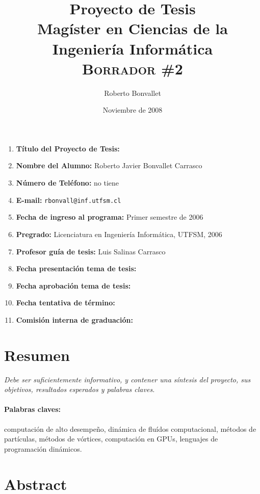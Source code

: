\documentclass[11pt,spanish]{article}
\title{Proyecto de Tesis \\
    Magíster en Ciencias de la Ingeniería Informática \\
    \textsc{Borrador \#2}
}
\author{Roberto Bonvallet}
\date{Noviembre de 2008}
\begin{document}
\maketitle
\thispagestyle{empty}
\begin{enumerate}
    \item \textbf{Título del Proyecto de Tesis:}
 
    \item \textbf{Nombre del Alumno:}
        Roberto Javier Bonvallet Carrasco
    \item \textbf{Número de Teléfono:}
        no tiene
         
    \item \textbf{E-mail:}
        \texttt{rbonvall@inf.utfsm.cl}
    \item \textbf{Fecha de ingreso al programa:}
        Primer semestre de 2006
    \item \textbf{Pregrado:}
        Licenciatura en Ingeniería Informática, UTFSM, 2006
    \item \textbf{Profesor guía de tesis:}
        Luis Salinas Carrasco
    \item \textbf{Fecha presentación tema de tesis:}
    \item \textbf{Fecha aprobación tema de tesis:}
    \item \textbf{Fecha tentativa de término:}
    \item \textbf{Comisión interna de graduación:}
\end{enumerate}

\newpage
\section*{Resumen}

\emph{Debe ser suficientemente informativo, y contener una síntesis del proyecto, sus
objetivos, resultados esperados y palabras claves. }



\paragraph{Palabras claves:}
computación de alto desempeño,
dinámica de fluídos computacional,
métodos de partículas,
métodos de vórtices,
computación en GPUs,
lenguajes de programación dinámicos.


\section*{Abstract}
\end{document}
